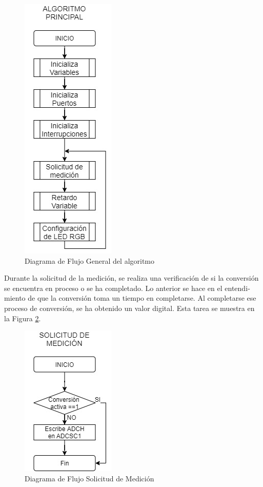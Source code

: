 \documentclass[journal]{IEEEtran}
\begin{document}
\begin{otherlanguage}{spanish}
\begin{figure}[H]
    \centering
    \includegraphics[scale=.52]{Imágenes/Practica 5.1.jpg}
    \caption{Diagrama de Flujo General del algoritmo}
    \label{DDF_General}
\end{figure}

Durante la solicitud de la medición, se realiza una verificación de si la conversión se encuentra en proceso o se ha completado. Lo anterior se hace en el entendimiento de que la conversión toma un tiempo en completarse. Al completarse ese proceso de conversión, se ha obtenido un valor digital. Esta tarea se muestra en la Figura \ref{DDF_MED}.

\begin{figure}[H]
    \centering
    \includegraphics[scale=.52]{Imágenes/Practica 5.2.jpg}
    \caption{Diagrama de Flujo Solicitud de Medición}
    \label{DDF_MED}
\end{figure}


\end{otherlanguage}
\end{document}
